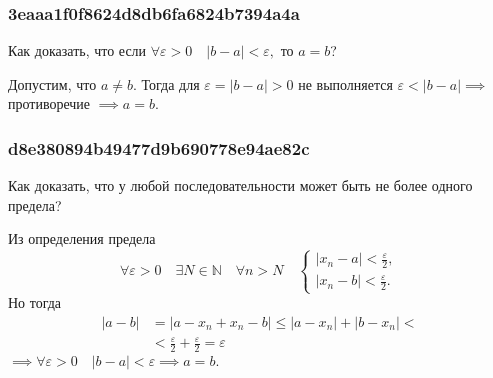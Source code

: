 \documentclass[11pt, a5paper]{article}
\newenvironment{note}[1]{\goodbreak\par\subsubsection{\hfill \color{lightgray}\tiny #1}}{}
\newenvironment{cloze}[2][\ldots]{\begin{leftbar}}{\end{leftbar}}
\begin{document}
    \begin{note}{3eaaa1f0f8624d8db6fa6824b7394a4a}
        Как доказать, что если \( \forall \varepsilon > 0 \quad |b - a| <
        \varepsilon, \) то \( a = b \)?

        \begin{cloze}{1}
            Допустим, что \( a \neq b. \) Тогда для \( \varepsilon = |b - a| > 0
            \) не выполняется \( \varepsilon < |b - a| \implies \) противоречие
            \( \implies a = b. \)
        \end{cloze}
    \end{note}

    \begin{note}{d8e380894b49477d9b690778e94ae82c}
        Как доказать, что у любой последовательности может быть не более одного
        предела?

        \begin{cloze}{1}
            Из определения предела \[
                \forall \varepsilon > 0 \quad \exists N \in \mathbb N \quad \forall n > N \quad
                \begin{cases}
                    |x_n - a| < \frac{\varepsilon}{2}, \\
                    |x_n - b| < \frac{\varepsilon}{2}.
                \end{cases}
            \]
            Но тогда \[
                \begin{aligned}
                    |a - b| &= |a - x_n + x_n - b| \leqslant |a - x_n| + |b - x_n| < \\
                            &< \frac{\varepsilon}{2} +
                            \frac{\varepsilon}{2} = \varepsilon
                \end{aligned}
            \] \(
                \implies \forall \varepsilon > 0 \quad |b - a| <
                \varepsilon \implies a = b.
            \)
        \end{cloze}
    \end{note}
\end{document}
